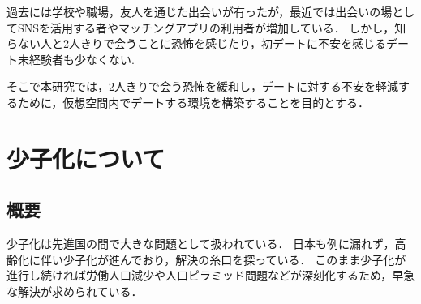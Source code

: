 \documentclass[12pt,a4j,titlepage]{ltjsarticle}
\begin{document}
過去には学校や職場，友人を通じた出会いが有ったが，最近では出会いの場としてSNSを活用する者やマッチングアプリの利用者が増加している．
しかし，知らない人と2人きりで会うことに恐怖を感じたり，初デートに不安を感じるデート未経験者も少なくない\cite{prtimes,yoshimura2020}.

そこで本研究では，2人きりで会う恐怖を緩和し，デートに対する不安を軽減するために，仮想空間内でデートする環境を構築することを目的とする．
\clearpage

\section{少子化について}\label{少子化について}
\subsection{概要}
少子化は先進国の間で大きな問題として扱われている．
日本も例に漏れず，高齢化に伴い少子化が進んでおり，解決の糸口を探っている．
このまま少子化が進行し続ければ労働人口減少や人口ピラミッド問題などが深刻化するため，早急な解決が求められている．
\end{document}
